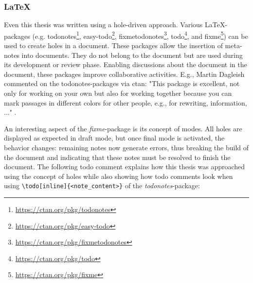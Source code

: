 \subsubsection{\LaTeX}
Even this thesis was written using a hole-driven approach.
Various \LaTeX-packages (e.g. todonotes\footnote{\url{https://ctan.org/pkg/todonotes}}, easy-todo\footnote{\url{https://ctan.org/pkg/easy-todo}}, fixmetodonotes\footnote{\url{https://ctan.org/pkg/fixmetodonotes}}, todo\footnote{\url{https://ctan.org/pkg/todo}}, and fixme\footnote{\url{https://ctan.org/pkg/fixme}}) can be used to create holes in a document.
These packages allow the insertion of meta-notes into documents.
They do not belong to the document but are used during its development or review phase.
Enabling discussions about the document in the document, these packages improve collaborative activities.
E.g., Martin Dagleish commented on the todonotes-packages via ctan: "This package is excellent, not only for working on your own but also for working together because you can mark passages in different colors for other people, e.g., for rewriting, information, ..." \cite{dagleish_comment_2021}.

An interesting aspect of the \emph{fixme}-package is its concept of modes.
All holes are displayed as expected in draft mode, but once final mode is activated, the behavior changes: remaining notes now generate errors, thus breaking the build of the document and indicating that these notes must be resolved to finish the document.
The following todo comment explains how this thesis was approached using the concept of holes while also showing how todo comments look when using \verb|\todo[inline]{<note_content>}| of the \emph{todonotes}-package:

\vspace{3mm}


